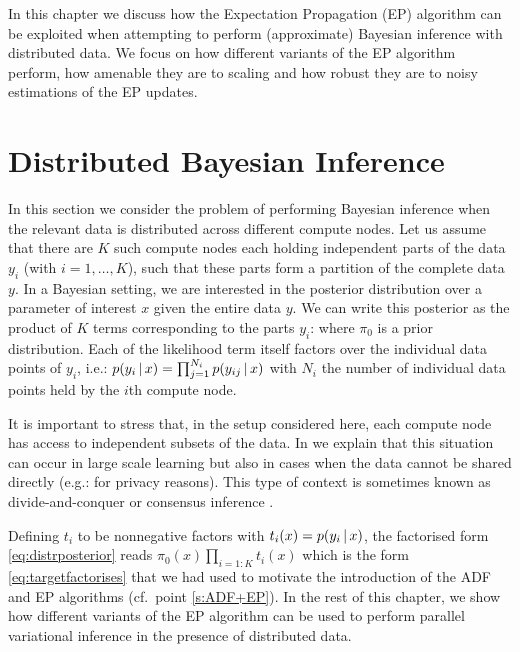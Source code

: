
In this chapter we discuss how the Expectation Propagation (EP) algorithm can be exploited when attempting to perform (approximate) Bayesian inference with distributed data. 
We focus on how different variants of the EP algorithm perform, how amenable they are to scaling and how robust they are to noisy estimations of the EP updates. 

\section{Distributed Bayesian Inference}

In this section we consider the problem of performing Bayesian inference when the relevant data is distributed across different compute nodes. 
Let us assume that there are $K$ such compute nodes each holding independent parts of the data $y_i$ (with $i=1,\dots,K$), such that these parts form a partition of the complete data $y$. 
In a Bayesian setting, we are interested in the posterior distribution over a parameter of interest $x$ given the entire data $y$. We can write this posterior as the product of $K$ terms corresponding to the parts $y_i$: 
%
%
where $\pi_0$ is a prior distribution. Each of the likelihood term itself factors over the individual data points of $y_i$, i.e.: $p(y_i\,|\, x)=\prod_{j=1}^{N_i}p(y_{ij}\,|\, x)$ with $N_i$ the number of individual data points held by the $i$th compute node.

It is important to stress that, in the setup considered here, each compute node has access to independent subsets of the data. In \citet{hasenclever16} we explain that this situation can occur in large scale learning but also in cases when the data cannot be shared directly (e.g.: for privacy reasons). This type of context is sometimes known as divide-and-conquer or consensus inference \citep{kleiner14,battey15,zhao16}. 

Defining $t_i$ to be nonnegative factors with $t_i(x)=p(y_i\,|\, x)$, the factorised form \eqref{eq:distrposterior} reads $\pi_0(x)\prod_{i=1:K}t_i(x)$ which is the form \eqref{eq:targetfactorises} that we had used to motivate the introduction of the ADF and EP algorithms (cf.\ point \ref{s:ADF+EP}).
In the rest of this chapter, we show how different variants of the EP algorithm can be used to perform parallel variational inference in the presence of distributed data. 

